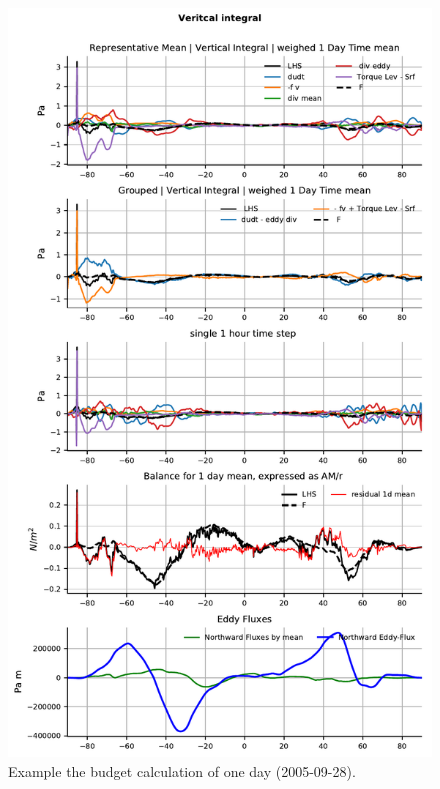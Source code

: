 \documentclass[11pt]{article}
\numberwithin{equation}{section}
\begin{document}
\begin{figure}[h!]
\centerline{\includegraphics[scale=.7]{exmpl_repres_dmean_ps_iews_2005-09-28.pdf}}
\caption{Example the budget calculation of one day (2005-09-28).}
\label{fig:AM_example2}
\end{figure}
\end{document}
